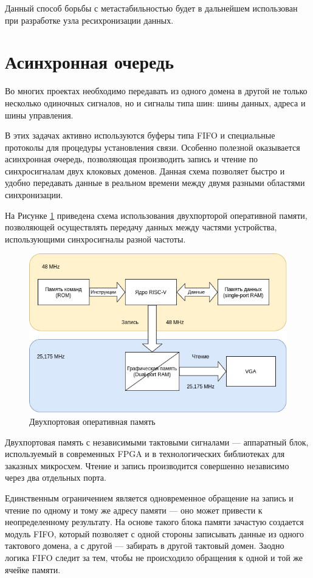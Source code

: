 Данный способ борьбы с метастабильностью будет в дальнейшем использован при разработке узла ресихронизации данных.

\section{Асинхронная очередь}

Во многих проектах необходимо передавать из одного домена в другой не только несколько одиночных сигналов, но и сигналы типа шин: шины данных, адреса и шины управления.

В этих задачах активно используются буферы типа FIFO и специальные протоколы для процедуры установления связи. Особенно полезной оказывается асинхронная очередь, позволяющая производить запись и чтение по синхросигналам двух клоковых доменов.
Данная схема позволяет быстро и удобно передавать данные в реальном времени между двумя разными областями синхронизации.

На Рисунке \ref{fig:async-fifo} приведена схема использования двухпорторой оперативной памяти, позволяющей осуществлять передачу данных между частями устройства, использующими синхросигналы разной частоты.

\begin{figure}[h!]
	\centering
	\includegraphics[width=0.65\linewidth]{course-scheme/images/dual-port-ram}
	\caption{Двухпортовая оперативная память}
	\label{fig:async-fifo}
\end{figure}

Двухпортовая память с независимыми тактовыми сигналами --- аппаратный блок, используемый в современных FPGA и в технологических библиотеках для заказных микросхем. Чтение и запись производится совершенно независимо через два отдельных порта.

Единственным ограничением является одновременное обращение на запись и чтение по одному и тому же адресу памяти --- оно может привести к неопределенному результату. На основе такого блока памяти зачастую создается модуль FIFO, который позволяет с одной стороны записывать данные из одного тактового домена, а с другой — забирать в другой тактовый домен. Заодно логика FIFO следит за тем, чтобы не происходило обращения к одной и той же ячейке памяти.


